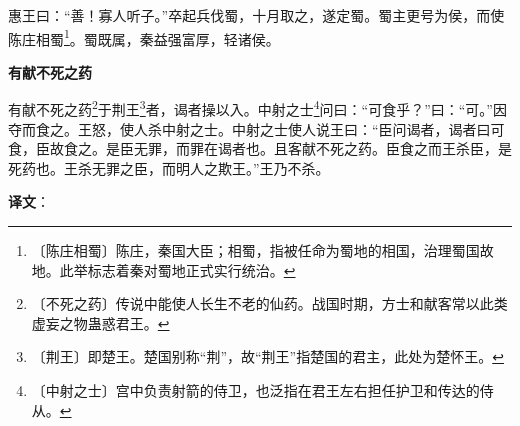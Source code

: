 \documentclass[12pt,UTF-8,openany,a4]{ctexbook}
\begin{document}
\begin{large}
    惠王曰：“善！寡人听子。”卒起兵伐蜀，十月取之，遂定蜀。蜀主更号为侯，而使陈庄相蜀\footnote{〔陈庄相蜀〕\yiwen 陈庄，秦国大臣；相蜀，指被任命为蜀地的相国，治理蜀国故地。此举标志着秦对蜀地正式实行统治。}。蜀既属，秦益强富厚，轻诸侯。
    
    \begin{center}{\Large\textbf{有献不死之药}}\end{center}
    
    有献不死之药\footnote{〔不死之药〕\yiwen 传说中能使人长生不老的仙药。战国时期，方士和献客常以此类虚妄之物蛊惑君王。}于荆王\footnote{〔荆王〕\yiwen 即楚王。楚国别称“荆”，故“荆王”指楚国的君主，此处为楚怀王。}者，谒者操以入。中射之士\footnote{〔中射之士〕\yiwen 宫中负责射箭的侍卫，也泛指在君王左右担任护卫和传达的侍从。}问曰：“可食乎？”曰：“可。”因夺而食之。王怒，使人杀中射之士。中射之士使人说王曰：“臣问谒者，谒者曰可食，臣故食之。是臣无罪，而罪在谒者也。且客献不死之药。臣食之而王杀臣，是死药也。王杀无罪之臣，而明人之欺王。”王乃不杀。

\end{large}


\newpage

\begin{Large}
   \noindent \textbf{译文}：
\end{Large}

\vspace{1em}
\end{document}
